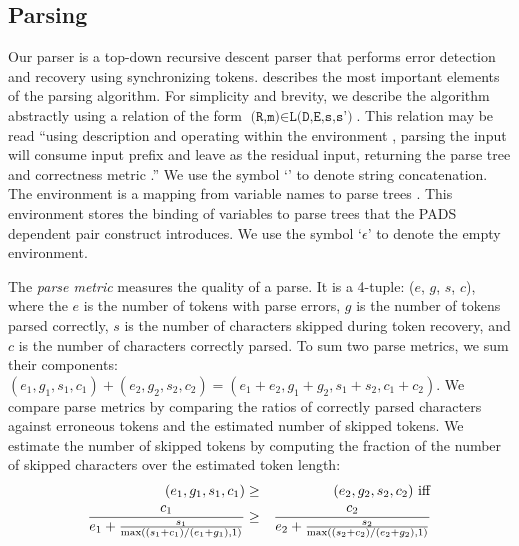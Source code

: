 \subsection{Parsing}
\label{sec:parse}
Our parser is a top-down recursive descent parser
that performs error detection and recovery using synchronizing tokens.
 describes the most important elements
of the parsing algorithm.  For simplicity and brevity, we
describe the algorithm abstractly
using a relation of the form 
${\texttt{(R,m)} \in \texttt{L(D,E,s,s')}}$.  This relation may be
read ``using description  and operating within the environment ,
parsing the input  will consume input prefix  and leave  as the residual input, 
returning the parse tree  and correctness metric .''  We use the symbol `' to denote string concatenation. 
The environment  is a mapping from variable names
 to parse trees .  This environment stores the
binding of variables to parse trees that the PADS dependent
pair construct introduces.   We use the symbol `$\epsilon$' to denote the empty environment.

The {\em parse metric}  measures the quality of a parse. It is a 
4-tuple: ($e$, $g$, $s$, $c$), where the $e$ is the number of tokens
with parse errors, $g$ is the number of tokens parsed correctly,
$s$ is the number of 
characters skipped during  token recovery, 
and $c$ is the number of characters correctly parsed. 
To sum two parse metrics, we sum their components:
$(e_1, g_1, s_1, c_1) + (e_2, g_2, s_2, c_2) = 
(e_1 + e_2, g_1 + g_2, s_1 + s_2, c_1 + c_2)$.
We compare parse metrics by comparing the ratios of correctly
parsed characters against erroneous tokens and the estimated number of
skipped tokens.  We estimate the number of skipped tokens
by computing the
fraction of the number of skipped characters over the estimated token
length:
\begin{eqnarray*}
(e_1, g_1, s_1, c_1) &\ge& (e_2, g_2, s_2, c_2)~ \rm{iff} \\
\frac{c_1}{e_1+\frac{s_1}{\max((s_1+c_1)/(e_1+g_1), 1)}} &\ge& 
\frac{c_2}{e_2+\frac{s_2}{\max((s_2+c_2)/(e_2+g_2), 1)}} \\
\end{eqnarray*}

